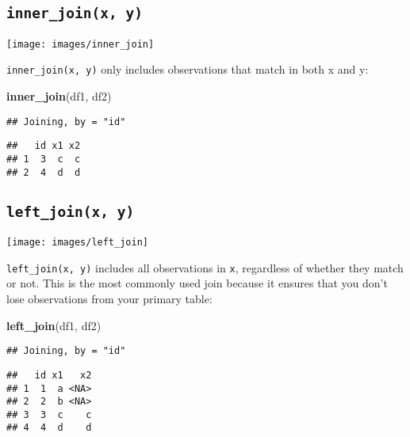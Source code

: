 \documentclass[]{book}
\newenvironment{Shaded}{\begin{snugshade}}{\end{snugshade}}
\newcommand{\KeywordTok}[1]{\textcolor[rgb]{0.13,0.29,0.53}{\textbf{{#1}}}}
\newcommand{\NormalTok}[1]{{#1}}
\begin{document}
\subsection{\texorpdfstring{\texttt{inner\_join(x,\ y)}}{inner\_join(x, y)}}\label{inner_joinx-y}

\begin{center}\texttt{[image: images/inner\_join]} \end{center}

\texttt{inner\_join(x,\ y)} only includes observations that match in
both x and y:

\begin{Shaded}
\begin{Highlighting}[]
\KeywordTok{inner_join}\NormalTok{(df1, df2)}
\end{Highlighting}
\end{Shaded}

\begin{verbatim}
## Joining, by = "id"
\end{verbatim}

\begin{verbatim}
##   id x1 x2
## 1  3  c  c
## 2  4  d  d
\end{verbatim}

\subsection{\texorpdfstring{\texttt{left\_join(x,\ y)}}{left\_join(x, y)}}\label{left_joinx-y}

\begin{center}\texttt{[image: images/left\_join]} \end{center}

\texttt{left\_join(x,\ y)} includes all observations in \texttt{x},
regardless of whether they match or not. This is the most commonly used
join because it ensures that you don't lose observations from your
primary table:

\begin{Shaded}
\begin{Highlighting}[]
\KeywordTok{left_join}\NormalTok{(df1, df2)}
\end{Highlighting}
\end{Shaded}

\begin{verbatim}
## Joining, by = "id"
\end{verbatim}

\begin{verbatim}
##   id x1   x2
## 1  1  a <NA>
## 2  2  b <NA>
## 3  3  c    c
## 4  4  d    d
\end{verbatim}
\end{document}
